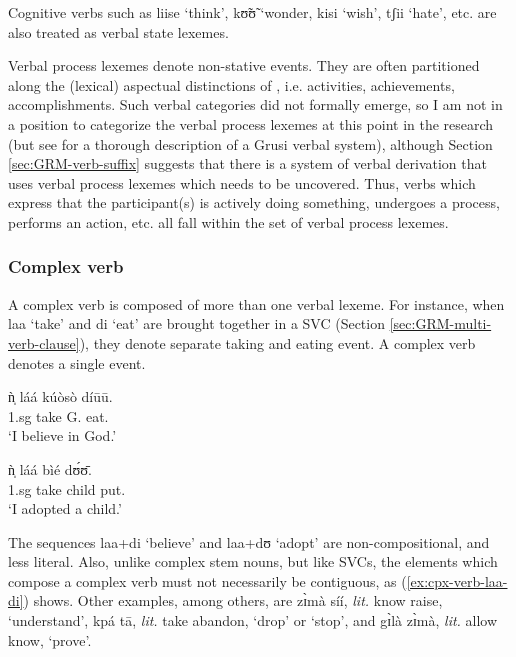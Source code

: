 \begin{exe}
\begin{exe}
\begin{exe}
{\begin{exe}
\begin{exe}
\begin{exe}
\begin{exe}
\begin{exe}
\begin{exe}
\begin{exe}
\begin{exe}
\begin{exe}
\begin{exe}
\begin{exe}
\begin{exe}
\begin{exe}
\begin{exe}
\begin{exe}
\begin{exe}
\begin{exe}
\begin{exe}
\begin{exe}
Cognitive verbs such as {\sls liise} `think',  {\sls kʊ̃ʊ̃} `wonder, 
{\sls kisi} `wish', {\sls tʃii} `hate', etc.  are also treated as verbal 
state
lexemes. 

Verbal process lexemes denote non-stative events. They are often partitioned
along the
(lexical) aspectual distinctions of  \citet{Vend57}, i.e. activities, 
achievements, accomplishments. Such verbal categories did not formally emerge, 
so I am not in a position to categorize the verbal process lexemes at this 
point 
in the research (but see \citealt[51]{Bonv88} for a thorough description of a 
Grusi verbal system), although Section \ref{sec:GRM-verb-suffix} suggests that 
there is a system of verbal derivation  that  uses verbal process lexemes which 
needs to be uncovered.  Thus, verbs which express that the participant(s) is 
actively doing something, undergoes a process, performs an action, etc. all 
fall 
within the  set of verbal process lexemes. 



\subsubsection{Complex verb}
\label{sec:GRM-complex-verb}

A complex verb is  composed of more than one verbal lexeme. For
instance, when {\sls laa} `take' and {\sls di}
`eat' are brought together in a SVC (Section \ref{sec:GRM-multi-verb-clause}),
they denote separate taking and eating event. A complex verb denotes a single 
event.

\ea\label{ex:cpx-verb-laa-di}
\ea
 \gll ǹ̩ láá kúòsò díūū.\\
{\sc 1.sg} take G.  eat.{\foc}\\
\glt `I believe in God.'

\ex
 \gll  ǹ̩ láá bìé dʊ́ʊ̄.\\
{\sc 1.sg} take child put.{\foc}\\
\glt `I adopted a child.'
\z 
 \z
 
 The sequences  {\sls laa}+{\sls di} `believe'  and {\sls laa}+{\sls dʊ} 
`adopt'  
are  non-compositional, and less literal. Also, unlike complex stem nouns, but 
like SVCs, the elements which compose a complex verb must not necessarily be 
contiguous,  as  (\ref{ex:cpx-verb-laa-di}) shows. Other examples, among 
others, 
 are {\sls zɪ̀mà síí}, {\it lit.} know raise, `understand',  {\sls kpá 
tā}, 
{\it lit.}  take abandon, `drop' or `stop', and {\sls gɪ̀là zɪ̀mà}, {\it 
lit.} 
allow know, `prove'.




\end{exe}
\end{exe}
\end{exe}
\end{exe}
\end{exe}
\end{exe}
\end{exe}
\end{exe}
\end{exe}
\end{exe}
\end{exe}
\end{exe}
\end{exe}
\end{exe}
\end{exe}
\end{exe}
\end{exe}
\end{exe}
\end{exe}}
\end{exe}
\end{exe}
\end{exe}
